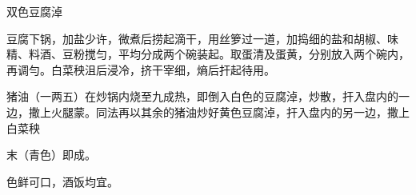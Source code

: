 \begin{recipe}[鸳鸯豆腐淖]{双色豆腐淖}

\ingredients


\cooking

\step 豆腐下锅，加盐少许，微煮后捞起滴干，用丝箩过一道，加捣细的盐和胡椒、味精、料酒、豆粉搅匀，平均分成两个碗装起。取蛋清及蛋黄，分别放入两个碗内，再调勻。白菜秧沮后浸冷，挤干宰细，熵后扞起待用。

\step 猪油（一两五）在炒锅内烧至九成热，即倒入白色的豆腐淖，炒散，扞入盘内的一边，撒上火腿蒙。同法再以其余的猪油炒好黄色豆腐淖，扞入盘内的另一边，撒上白菜秧

末（青色）即成。

\notes

色鲜可口，酒饭均宜。

\end{recipe}

